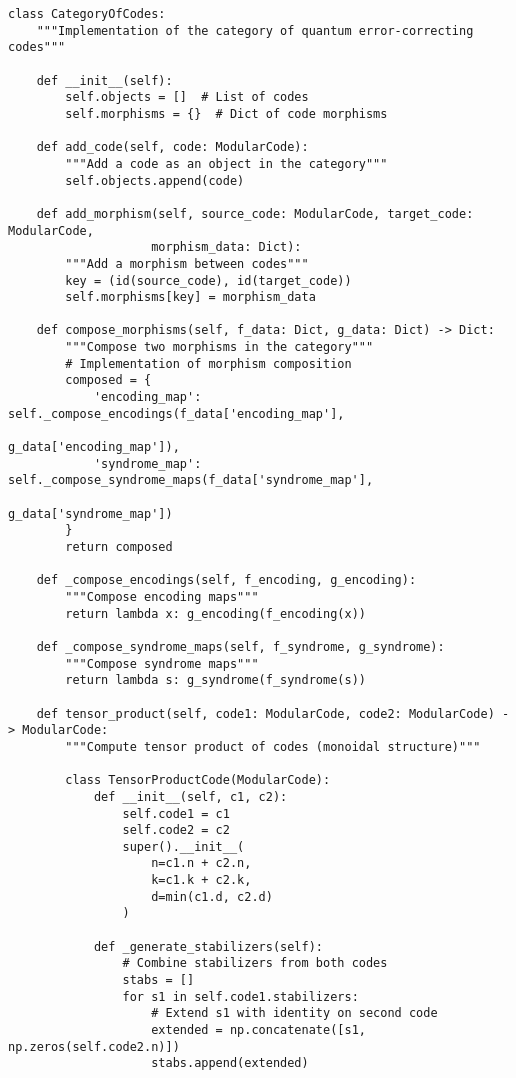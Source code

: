\documentclass[12pt,a4paper]{article}
\begin{document}
\begin{lstlisting}[style=python,caption=Advanced categorical structures for QEC]
class CategoryOfCodes:
    """Implementation of the category of quantum error-correcting codes"""
    
    def __init__(self):
        self.objects = []  # List of codes
        self.morphisms = {}  # Dict of code morphisms
        
    def add_code(self, code: ModularCode):
        """Add a code as an object in the category"""
        self.objects.append(code)
        
    def add_morphism(self, source_code: ModularCode, target_code: ModularCode, 
                    morphism_data: Dict):
        """Add a morphism between codes"""
        key = (id(source_code), id(target_code))
        self.morphisms[key] = morphism_data
        
    def compose_morphisms(self, f_data: Dict, g_data: Dict) -> Dict:
        """Compose two morphisms in the category"""
        # Implementation of morphism composition
        composed = {
            'encoding_map': self._compose_encodings(f_data['encoding_map'], 
                                                   g_data['encoding_map']),
            'syndrome_map': self._compose_syndrome_maps(f_data['syndrome_map'],
                                                       g_data['syndrome_map'])
        }
        return composed
        
    def _compose_encodings(self, f_encoding, g_encoding):
        """Compose encoding maps"""
        return lambda x: g_encoding(f_encoding(x))
        
    def _compose_syndrome_maps(self, f_syndrome, g_syndrome):
        """Compose syndrome maps"""
        return lambda s: g_syndrome(f_syndrome(s))
        
    def tensor_product(self, code1: ModularCode, code2: ModularCode) -> ModularCode:
        """Compute tensor product of codes (monoidal structure)"""
        
        class TensorProductCode(ModularCode):
            def __init__(self, c1, c2):
                self.code1 = c1
                self.code2 = c2
                super().__init__(
                    n=c1.n + c2.n,
                    k=c1.k + c2.k,
                    d=min(c1.d, c2.d)
                )
                
            def _generate_stabilizers(self):
                # Combine stabilizers from both codes
                stabs = []
                for s1 in self.code1.stabilizers:
                    # Extend s1 with identity on second code
                    extended = np.concatenate([s1, np.zeros(self.code2.n)])
                    stabs.append(extended)
                    

\end{lstlisting}
\end{document}
